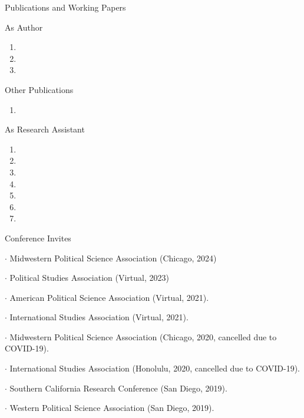 \documentclass[10pt]{resume} %
\begin{document}
	\begin{rSection}{Publications and Working Papers}\itemsep -5pt
		
	\begin{rSubsection}{As Author}{}{}{}
  \begin{enumerate}
    \item {}
    \item {}
    \item {}
  \end{enumerate}
  \end{rSubsection}
  
  	\begin{rSubsection}{Other Publications}{}{}{}
  \begin{enumerate}
    \item {}
  \end{enumerate}
  \end{rSubsection}
  
  \begin{rSubsection}{As Research Assistant}{}{}{}
  \begin{enumerate}
    \item {}
    \item {}
    \item {}
    \item {}
    \item {}
    \item {}
    \item {}
  \end{enumerate}
	\end{rSubsection}

	\end{rSection}
	
	\begin{rSection}{Conference Invites}
		\itemsep -5pt
		\item $\cdot$ Midwestern Political Science Association (Chicago, 2024)
		\item $\cdot$ Political Studies Association (Virtual, 2023)
		\item $\cdot$ American Political Science Association (Virtual, 2021).
		\item $\cdot$ International Studies Association (Virtual, 2021).
		\item $\cdot$ Midwestern Political Science Association (Chicago, 2020, cancelled due to COVID-19).
		\item $\cdot$ International Studies Association (Honolulu, 2020, cancelled due to COVID-19).
		\item $\cdot$ Southern California Research Conference (San Diego, 2019).
		\item $\cdot$ Western Political Science Association (San Diego, 2019).
	\end{rSection}
	
\end{document}
